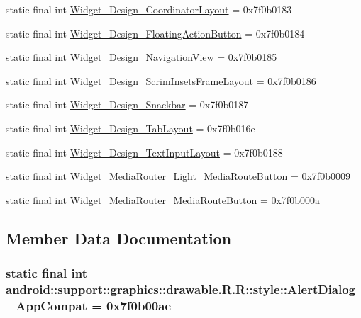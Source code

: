 \begin{CompactItemize}
\item 
static final int \hyperlink{classandroid_1_1support_1_1graphics_1_1drawable_1_1_r_1_1style_bc0a0dd971fd84878e6ae8eb93c10734}{Widget\_\-Design\_\-CoordinatorLayout} = 0x7f0b0183
\item 
static final int \hyperlink{classandroid_1_1support_1_1graphics_1_1drawable_1_1_r_1_1style_1e819b178d5c7313069232537d03da73}{Widget\_\-Design\_\-FloatingActionButton} = 0x7f0b0184
\item 
static final int \hyperlink{classandroid_1_1support_1_1graphics_1_1drawable_1_1_r_1_1style_6611de2ba071dad847abe799c6b2713c}{Widget\_\-Design\_\-NavigationView} = 0x7f0b0185
\item 
static final int \hyperlink{classandroid_1_1support_1_1graphics_1_1drawable_1_1_r_1_1style_6fd281374c81a7769d0a5b25cf2cc80d}{Widget\_\-Design\_\-ScrimInsetsFrameLayout} = 0x7f0b0186
\item 
static final int \hyperlink{classandroid_1_1support_1_1graphics_1_1drawable_1_1_r_1_1style_c1faa97055b32330b233d9a7f190234b}{Widget\_\-Design\_\-Snackbar} = 0x7f0b0187
\item 
static final int \hyperlink{classandroid_1_1support_1_1graphics_1_1drawable_1_1_r_1_1style_86e7c25173d0663131ba3cc823693bc1}{Widget\_\-Design\_\-TabLayout} = 0x7f0b016e
\item 
static final int \hyperlink{classandroid_1_1support_1_1graphics_1_1drawable_1_1_r_1_1style_04572b3a87650134c945ffb642b7f218}{Widget\_\-Design\_\-TextInputLayout} = 0x7f0b0188
\item 
static final int \hyperlink{classandroid_1_1support_1_1graphics_1_1drawable_1_1_r_1_1style_09388477965ffe1fd64c4abeb2aed65a}{Widget\_\-MediaRouter\_\-Light\_\-MediaRouteButton} = 0x7f0b0009
\item 
static final int \hyperlink{classandroid_1_1support_1_1graphics_1_1drawable_1_1_r_1_1style_941fd76e87f53eb2239ba7b068da1779}{Widget\_\-MediaRouter\_\-MediaRouteButton} = 0x7f0b000a
\end{CompactItemize}


\subsection{Member Data Documentation}
\hypertarget{classandroid_1_1support_1_1graphics_1_1drawable_1_1_r_1_1style_19e7e4006208d1b4ffb92fc493d15e39}{
\subsubsection[{AlertDialog\_\-AppCompat}]{\setlength{\rightskip}{0pt plus 5cm}static final int android::support::graphics::drawable.R.R::style::AlertDialog\_\-AppCompat = 0x7f0b00ae}}
\label{classandroid_1_1support_1_1graphics_1_1drawable_1_1_r_1_1style_19e7e4006208d1b4ffb92fc493d15e39}


